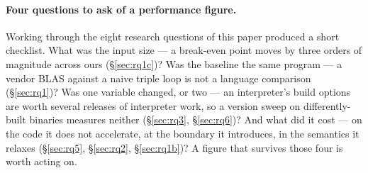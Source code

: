 \paragraph{Four questions to ask of a performance figure.} Working through the eight research
questions of this paper produced a short checklist. What was the input size --- a break-even point moves by three
orders of magnitude across ours (\S\ref{sec:rq1c})? Was the baseline the same program --- a
vendor BLAS against a naive triple loop is not a language comparison (\S\ref{sec:rq1})? Was one
variable changed, or two --- an interpreter's build options are worth several releases of
interpreter work, so a version sweep on differently-built binaries measures neither
(\S\ref{sec:rq3}, \S\ref{sec:rq6})? And what did it cost --- on the code it does not
accelerate, at the boundary it introduces, in the semantics it relaxes (\S\ref{sec:rq5},
\S\ref{sec:rq2}, \S\ref{sec:rq1b})? A figure that survives those four is worth acting on.
